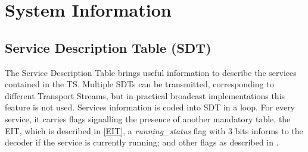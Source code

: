 \documentclass[
	12pt,				%
	openright,			%
	twoside,			%
	a4paper,			%
	brazil,
	french,				%
	english
	]{abntex2}
\begin{document}
\section{System Information} 
\label{abnt_psi}

\subsection{Service Description Table (SDT)}
\label{SDT}
The Service Description Table brings useful information to describe the services contained in the TS. Multiple SDTs can be transmitted, corresponding to different Transport Streams, but in practical broadcast implementations this feature is not used. Services information is coded into SDT in a loop. For every service, it carries flags signalling the presence of another mandatory table, the EIT, which is described in \autoref{EIT}, a \textit{running\hspace{0.1mm}\_\hspace{0.1mm}status} flag with 3 bits informs to the decoder if the service is currently running; and other flags as described in .
\end{document}
